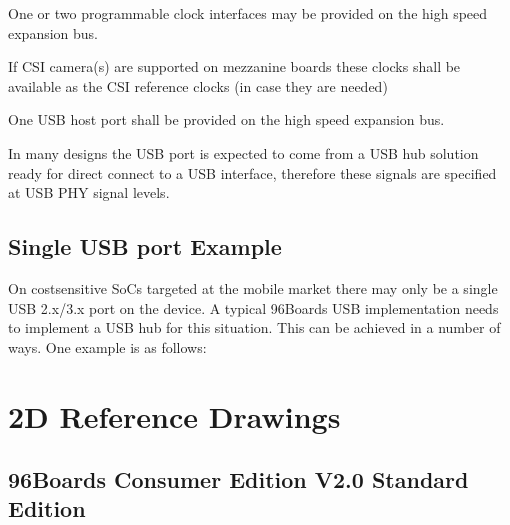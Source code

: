 \documentclass[a4paper,10pt,oneside,english]{sphinxmanual}
\begin{document}
\sphinxAtStartPar
{}

\sphinxAtStartPar
One or two programmable clock interfaces may be provided on the high speed expansion bus.

\sphinxAtStartPar
If CSI camera(s) are supported on mezzanine boards these clocks shall be available as the CSI reference clocks (in case they are needed)

\sphinxAtStartPar
{}

\sphinxAtStartPar
One USB host port shall be provided on the high speed expansion bus.

\sphinxAtStartPar
In many designs the USB port is expected to come from a USB hub solution ready for direct connect to a USB interface, therefore these signals are specified at USB PHY signal levels.


\section{Single USB port Example}
\label{\detokenize{chapter1-ce:single-usb-port-example}}
\sphinxAtStartPar
On cost\sphinxhyphen{}sensitive SoCs targeted at the mobile market there may only be a single USB 2.x/3.x port on the device. A typical 96Boards USB implementation needs to implement a USB hub for this situation. This can be achieved in a number of ways. One example is as follows:

\noindent{}


\chapter{2D Reference Drawings}
\label{\detokenize{chapter1-ce:d-reference-drawings}}

\section{96Boards Consumer Edition V2.0 Standard Edition}
\label{\detokenize{chapter1-ce:boards-consumer-edition-v2-0-standard-edition}}
\noindent{}

\noindent{}
\end{document}
